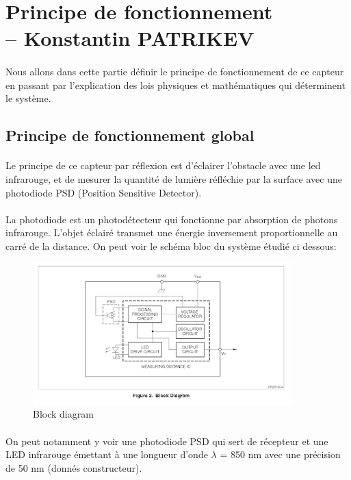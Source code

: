 \documentclass[oneside,a4paper,12pt]{article}
\begin{document}
	
	\newpage
	
	\section{Principe de fonctionnement\\ -- Konstantin PATRIKEV}
	\paragraph{}
	Nous allons dans cette partie définir le principe de fonctionnement de ce capteur en passant par l'explication des lois physiques et mathématiques qui déterminent le système.\\
	
	\subsection{Principe de fonctionnement global}
	\paragraph{}
	Le principe de ce capteur par réflexion est d'éclairer l’obstacle avec une led infrarouge, et de mesurer la quantité de lumière réfléchie par la surface avec une photodiode PSD (Position Sensitive Detector).
	\paragraph{}
	La photodiode est un photodétecteur qui fonctionne par absorption de photons infrarouge. L’objet éclairé transmet une énergie inversement proportionnelle au carré de la distance. On peut voir le schéma bloc du système étudié ci dessous:
	
	\begin{figure}[h]
		\centering
		\includegraphics[width=10cm]{img3.png}
		\caption{Block diagram}
	\end{figure} 
	\paragraph{}
	On peut notamment y voir une photodiode PSD qui sert de récepteur et une LED infrarouge émettant à une longueur d’onde  $\lambda$ = 850 nm avec une précision de 50 nm (donnés constructeur). 
\end{document}
